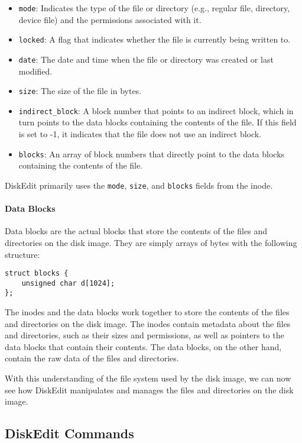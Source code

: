 \documentclass{article}
\begin{document}
\begin{itemize}
    \item \texttt{mode}: Indicates the type of the file or directory (e.g., regular file, directory, device file) and the permissions associated with it.
    \item \texttt{locked}: A flag that indicates whether the file is currently being written to.
    \item \texttt{date}: The date and time when the file or directory was created or last modified.
    \item \texttt{size}: The size of the file in bytes.
    \item \texttt{indirect\_block}: A block number that points to an indirect block, which in turn points to the data blocks containing the contents of the file. If this field is set to -1, it indicates that the file does not use an indirect block.
    \item \texttt{blocks}: An array of block numbers that directly point to the data blocks containing the contents of the file.
\end{itemize}

DiskEdit primarily uses the \texttt{mode}, \texttt{size}, and \texttt{blocks} fields from the inode.

\paragraph{Data Blocks}

Data blocks are the actual blocks that store the contents of the files and directories on the disk image. They are simply arrays of bytes with the following structure:

\begin{lstlisting}[style=cstyle]
struct blocks {
    unsigned char d[1024];
};
\end{lstlisting}

The inodes and the data blocks work together to store the contents of the files and directories on the disk image. The inodes contain metadata about the files and directories, such as their sizes and permissions, as well as pointers to the data blocks that contain their contents. The data blocks, on the other hand, contain the raw data of the files and directories.

With this understanding of the file system used by the disk image, we can now see how DiskEdit manipulates and manages the files and directories on the disk image.

\subsection{DiskEdit Commands}
\end{document}
